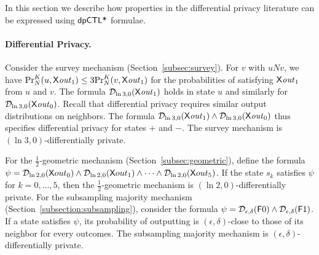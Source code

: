 In this section we describe how properties in the differential privacy literature can be expressed using $\dpCTLstar$ formulae.

\paragraph{Differential Privacy.}
Consider the survey mechanism (Section~\ref{subsec:survey}). For  $v$
with $u N v$, we have $\myPr{u}{K}{N}{\X \mathit{out}_1}\le
3\myPr{v}{K}{N}{\X \mathit{out}_1}$ for the probabilities of satisfying
$\X \mathit{out}_1$ from $u$ and $v$.
The formula $\dpriv{\ln 3}{0} (\X \mathit{out}_1)$ holds in state $u$
and similarly for $\dpriv{\ln 3}{0} (\X \mathit{out}_0)$.
Recall that differential privacy requires similar output distributions
on neighbors. The formula $\dpriv{\ln 3}{0} (\X
\mathit{out}_1)\wedge \dpriv{\ln 3}{0} (\X \mathit{out}_0)$ thus
specifies differential privacy for states $+$ and $-$.
The survey mechanism is $(\ln 3, 0)$-differentially private.



For the $\frac{1}{2}$-geometric mechanism (Section~\ref{subsec:geometric}),
define the formula
$\psi = \dpriv{\ln 2}{0} (\X out_0) \wedge \dpriv{\ln 2}{0} (\X out_1) \wedge
\cdots \wedge \dpriv{\ln 2}{0} (\X out_5)$. If the state $s_k$ satisfies
$\psi$ for $k = 0, \ldots, 5$, then the $\frac{1}{2}$-geometric mechanism is
$(\ln 2, 0)$-differentially private. For the subsampling majority
mechanism (Section~\ref{subsection:subsampling}), consider the formula
$\psi = \dpriv{\epsilon}{\delta} (\F 0) \wedge \dpriv{\epsilon}
  {\delta} (\F 1)$. If a state satisfies $\psi$, its probability of
outputting is $(\epsilon, \delta)$-close to those of its
neighbor for every outcomes. The subsampling majority
mechanism is $(\epsilon, \delta)$-differentially private.



